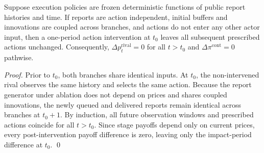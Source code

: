 \begin{proposition}\label{prop:invariance}
Suppose execution policies are frozen deterministic functions of public report histories and time. If reports are action independent, initial buffers and innovations are coupled across branches, and actions do not enter any other actor input, then a one-period action intervention at $t_0$ leaves all subsequent prescribed actions unchanged. Consequently, $\Delta p^{\mathrm{rival}}_t = 0$ for all $t > t_0$ and $\Delta\pi^{\mathrm{cont}} = 0$ pathwise.
\end{proposition}

\begin{proof}
Prior to $t_0$, both branches share identical inputs. At $t_0$, the non-intervened rival observes the same history and selects the same action. Because the report generator under ablation does not depend on prices and shares coupled innovations, the newly queued and delivered reports remain identical across branches at $t_0+1$. By induction, all future observation windows and prescribed actions coincide for all $t>t_0$. Since stage payoffs depend only on current prices, every post-intervention payoff difference is zero, leaving only the impact-period difference at $t_0$. \qed
\end{proof}

